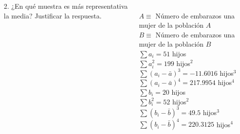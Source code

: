 \documentclass[aspectratio=149,10pt,t]{beamer}
\begin{document}
\begin{frame}
	\begin{columns}
		\begin{column}[T]{0.65\textwidth}
			\begin{enumerate}
			  \item[2.] ¿En qué muestra es más representativa la media? Justificar la respuesta.
			\end{enumerate}
		\end{column}
		\begin{column}[T]{0.35\textwidth}
			\\
			$A\equiv$ Número de embarazos una mujer de la población $A$\\
			$B\equiv$ Número de embarazos una mujer de la población $B$\\
			$\sum a_i=51$ hijos\\
			$\sum a_i^2=199$ hijos$^2$\\
			$\sum (a_i-\bar a)^3=-11.6016$ hijos$^3$\\
			$\sum (a_i-\bar a)^4=217.9954$ hijos$^4$\\
			$\sum b_i=20$ hijos\\
			$\sum b_i^2=52$ hijos$^2$\\
			$\sum (b_i-\bar b)^3=49.5$ hijos$^3$\\
			$\sum (b_i-\bar b)^4=220.3125$ hijos$^4$
			\end{column}
	\end{columns}
\end{frame}
\end{document}
